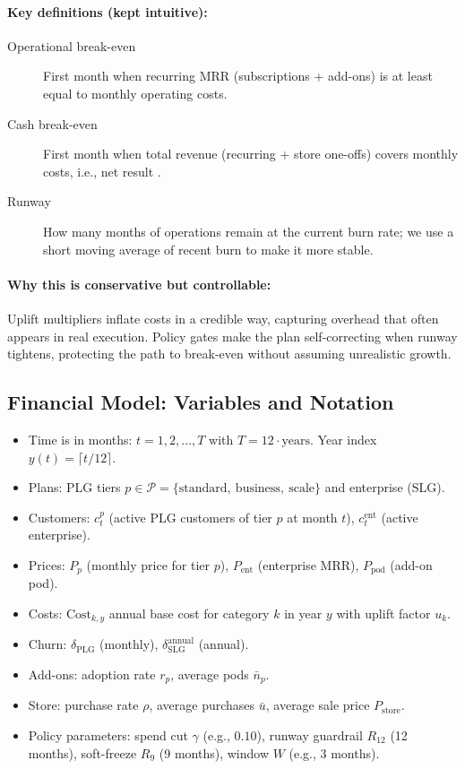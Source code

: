 \paragraph{Key definitions (kept intuitive):}
\begin{description}
\item[Operational break-even] First month when recurring MRR (subscriptions + add-ons) is at least equal to monthly operating costs.
\item[Cash break-even] First month when total revenue (recurring + store one-offs) covers mon\-th\-ly costs, i.e., net result .
\item[Runway] How many months of operations remain at the current burn rate; we use a short moving average of recent burn to make it more stable.
\end{description}

\paragraph{Why this is conservative but controllable:}
Uplift multipliers inflate costs in a credible way, capturing overhead that often appears in real execution. Policy gates make the plan self-correcting when runway tightens, protecting the path to break-even without assuming unrealistic growth.

\subsection{Financial Model: Variables and Notation}
\begin{itemize}
  \item Time is in months: $t = 1,2,\dots,T$ with $T = 12 \cdot \text{years}$. Year index $y(t) = \lceil t/12 \rceil$.
  \item Plans: PLG tiers $p \in \mathcal{P}=\{\text{standard},\ \text{business},\ \text{scale}\}$ and enterprise (SLG).
  \item Customers: $c^p_t$ (active PLG customers of tier $p$ at month $t$), $c^{\mathrm{ent}}_t$ (active enterprise).
  \item Prices: $P_p$ (monthly price for tier $p$), $P_{\mathrm{ent}}$ (enterprise MRR), $P_{\mathrm{pod}}$ (add-on pod).
  \item Costs: $\mathrm{Cost}_{k,y}$ annual base cost for category $k$ in year $y$ with uplift factor $u_k$.
  \item Churn: $\delta_{\mathrm{PLG}}$ (monthly), $\delta^{\mathrm{annual}}_{\mathrm{SLG}}$ (annual). 
  \item Add-ons: adoption rate $r_p$, average pods $\bar{n}_p$.
  \item Store: purchase rate $\rho$, average purchases $\bar{u}$, average sale price $P_{\mathrm{store}}$.
  \item Policy parameters: spend cut $\gamma$ (e.g., $0.10$), runway guardrail $R_{12}$ (12 months), soft-freeze $R_{9}$ (9 months), window $W$ (e.g., $3$ months).
\end{itemize}


